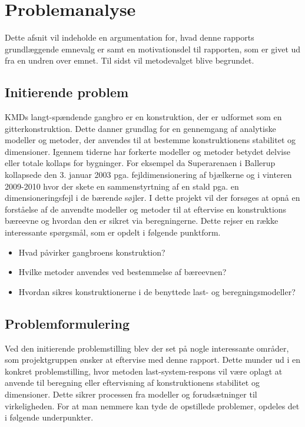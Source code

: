 \chapter{Problemanalyse}
Dette afsnit vil indeholde en argumentation for, hvad denne rapports grundlæggende emnevalg er samt en motivationsdel til rapporten, som er givet ud fra en undren over emnet. Til sidst vil metodevalget blive begrundet.  
 
\section{Initierende problem}
KMDs langt-spændende gangbro er en konstruktion, der er udformet som en gitterkonstruktion. Dette danner grundlag for en gennemgang af analytiske modeller og metoder, der anvendes til at bestemme konstruktionens stabilitet og dimensioner. Igennem tiderne har forkerte modeller og metoder betydet delvise eller totale kollaps for bygninger. For eksempel da Superarenaen i Ballerup kollapsede den 3. januar 2003  pga. fejldimensionering af bjælkerne og i vinteren 2009-2010 hvor der skete en sammenstyrtning af en stald pga. en dimensioneringsfejl i de bærende søjler. I dette projekt vil der forsøges at opnå en forståelse af de anvendte modeller og metoder til at eftervise en konstruktions bæreevne og hvordan den er sikret via beregningerne. Dette rejser en række interessante spørgsmål, som er opdelt i følgende punktform. 
 
 \begin{itemize}
 \item Hvad påvirker gangbroens konstruktion?
 \item Hvilke metoder anvendes ved bestemmelse af bæreevnen? 
 \item Hvordan sikres konstruktionerne i de benyttede last- og beregningsmodeller? 
 \end{itemize}
 
\section{Problemformulering}
Ved den initierende problemstilling blev der set på nogle interessante områder, som projektgruppen ønsker at eftervise med denne rapport. Dette munder ud i en konkret problemstilling, hvor metoden last-system-respons vil være oplagt at anvende til beregning eller eftervisning af konstruktionens stabilitet og dimensioner. Dette sikrer processen fra modeller og forudsætninger til virkeligheden. For at man nemmere kan tyde de opstillede problemer, opdeles det i følgende underpunkter.

